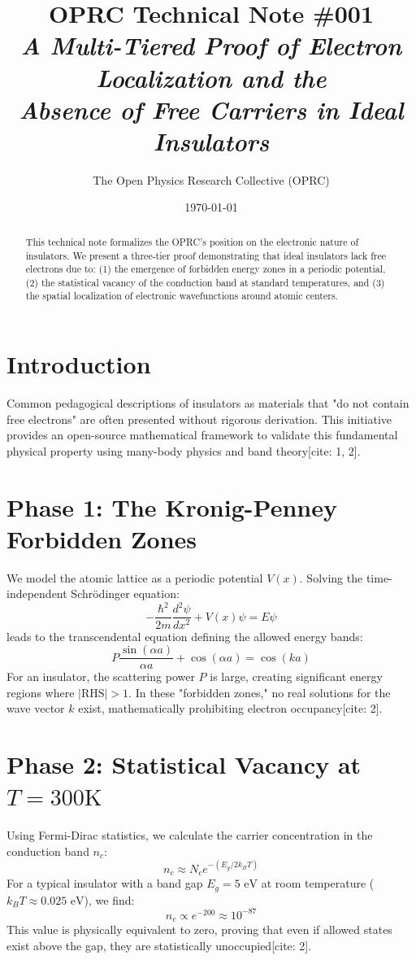 \documentclass[11pt,a4paper]{article}
\title{
    \textbf{OPRC Technical Note \#001} \\
    \large \textit{A Multi-Tiered Proof of Electron Localization and the \\ Absence of Free Carriers in Ideal Insulators}
}
\author{The Open Physics Research Collective (OPRC)}
\date{\today}
\begin{document}
\maketitle

\begin{abstract}
This technical note formalizes the OPRC's position on the electronic nature of insulators. We present a three-tier proof demonstrating that ideal insulators lack free electrons due to: (1) the emergence of forbidden energy zones in a periodic potential, (2) the statistical vacancy of the conduction band at standard temperatures, and (3) the spatial localization of electronic wavefunctions around atomic centers. 
\end{abstract}

\section{Introduction}
Common pedagogical descriptions of insulators as materials that "do not contain free electrons" are often presented without rigorous derivation. This initiative provides an open-source mathematical framework to validate this fundamental physical property using many-body physics and band theory[cite: 1, 2].

\section{Phase 1: The Kronig-Penney Forbidden Zones}
We model the atomic lattice as a periodic potential $V(x)$. Solving the time-independent Schrödinger equation:
$$-\frac{\hbar^2}{2m}\frac{d^2\psi}{dx^2} + V(x)\psi = E\psi$$
leads to the transcendental equation defining the allowed energy bands:
$$P \frac{\sin(\alpha a)}{\alpha a} + \cos(\alpha a) = \cos(ka)$$
For an insulator, the scattering power $P$ is large, creating significant energy regions where $|\text{RHS}| > 1$. In these "forbidden zones," no real solutions for the wave vector $k$ exist, mathematically prohibiting electron occupancy[cite: 2].

\section{Phase 2: Statistical Vacancy at $T = 300\text{K}$}
Using Fermi-Dirac statistics, we calculate the carrier concentration in the conduction band $n_c$:
$$n_c \approx N_c e^{-(E_g / 2k_B T)}$$
For a typical insulator with a band gap $E_g = 5\text{ eV}$ at room temperature ($k_B T \approx 0.025\text{ eV}$), we find:
$$n_c \propto e^{-200} \approx 10^{-87}$$
This value is physically equivalent to zero, proving that even if allowed states exist above the gap, they are statistically unoccupied[cite: 2].
\end{document}
